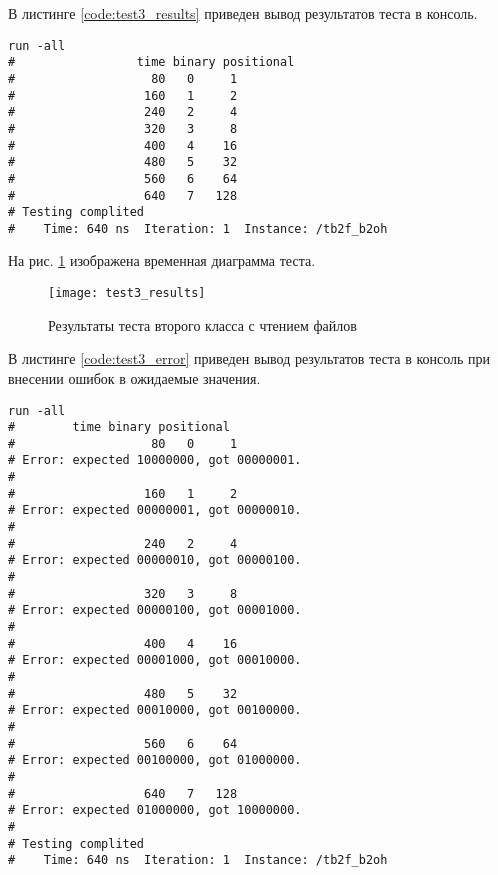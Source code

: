 \begin{multicols}{2}
	
	
\end{multicols}

В листинге \ref{code:test3_results} приведен вывод результатов теста в консоль.
\begin{lstlisting}[caption=Результаты теста второго класса с чтением файлов, label=code:test3_results, language={}]
run -all
# 		          time binary positional
#                   80   0     1
#                  160   1     2
#                  240   2     4
#                  320   3     8
#                  400   4    16
#                  480   5    32
#                  560   6    64
#                  640   7   128
# Testing complited
#    Time: 640 ns  Iteration: 1  Instance: /tb2f_b2oh
\end{lstlisting}

На рис. \ref{fig:test3_results} изображена временная диаграмма теста.
\begin{figure}[H]
	\begin{center}
		\texttt{[image: test3\_results]}
		\caption{Результаты теста второго класса с чтением файлов}
		\label{fig:test3_results}
	\end{center}
\end{figure}

В листинге \ref{code:test3_error} приведен вывод результатов теста в консоль при внесении ошибок в ожидаемые значения.
\begin{lstlisting}[caption=Результаты ошибочного теста второго класса с чтением файлов, label=code:test3_error, style=console]
run -all
# 		 time binary positional
#                   80   0     1
# Error: expected 10000000, got 00000001.
# 
#                  160   1     2
# Error: expected 00000001, got 00000010.
# 
#                  240   2     4
# Error: expected 00000010, got 00000100.
# 
#                  320   3     8
# Error: expected 00000100, got 00001000.
# 
#                  400   4    16
# Error: expected 00001000, got 00010000.
# 
#                  480   5    32
# Error: expected 00010000, got 00100000.
# 
#                  560   6    64
# Error: expected 00100000, got 01000000.
# 
#                  640   7   128
# Error: expected 01000000, got 10000000.
# 
# Testing complited
#    Time: 640 ns  Iteration: 1  Instance: /tb2f_b2oh
\end{lstlisting}
\vspace{-0.5cm}

